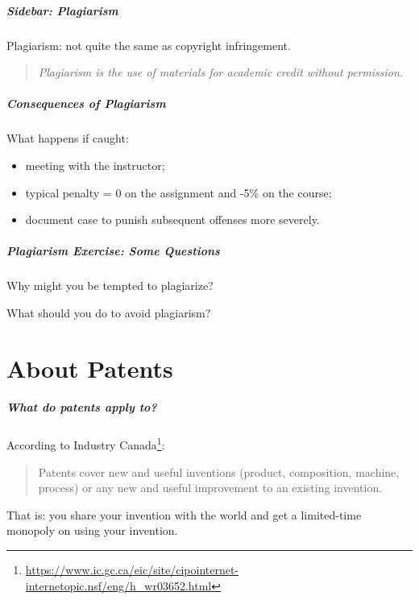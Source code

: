 \begin{frame}
\frametitle{Sidebar: Plagiarism}
\Large
\begin{changemargin}{1cm}
Plagiarism: not quite the same as copyright infringement.

\vspace*{1em}
\begin{quote}
\emph{Plagiarism is the use of materials for academic credit without permission.}
\end{quote}
\end{changemargin}
\end{frame}

\begin{frame}
\frametitle{Consequences of Plagiarism}
\Large
\begin{changemargin}{1cm}

What happens if caught:
\begin{itemize}
\item meeting with the instructor;
\item typical penalty = 0 on the assignment and -5\% on the course;
\item document case to punish subsequent offenses more severely.
\end{itemize}
\end{changemargin}
\end{frame}

\begin{frame}
\frametitle{Plagiarism Exercise: Some Questions}

\Large
\begin{changemargin}{1cm}
\vspace*{-2em}
Why might you be tempted to plagiarize?

What should you do to avoid plagiarism?
\end{changemargin}
\end{frame}

\part{About Patents}
\begin{frame}
\partpage
\end{frame}

\begin{frame}
\frametitle{What do patents apply to?}
\Large
\begin{changemargin}{1cm}
According to Industry Canada\footnote{\tiny \url{https://www.ic.gc.ca/eic/site/cipointernet-internetopic.nsf/eng/h_wr03652.html}}:

\vspace*{1em}
\begin{quote}
Patents cover new and useful inventions (product, composition, machine, process) or any new and useful improvement to an existing invention.
\end{quote}

That is: you share your invention with the world and get a limited-time monopoly on using your invention.
\end{changemargin}
\end{frame}

